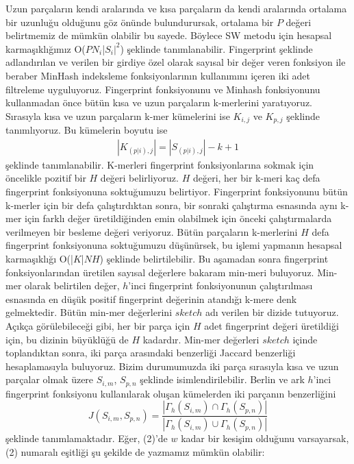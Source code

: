Uzun parçaların kendi aralarında ve kısa parçaların da kendi aralarında ortalama bir uzunluğu olduğunu göz önünde bulundurursak, ortalama bir $P$ değeri belirtmemiz de mümkün olabilir bu sayede. Böylece SW metodu için hesapsal karmaşıklığımız O($P$$N_i$|$S_i|^2$) şeklinde tanımlanabilir. Fingerprint şeklinde adlandırılan ve verilen bir girdiye özel olarak sayısal bir değer veren fonksiyon ile beraber MinHash indeksleme fonksiyonlarının kullanımını içeren iki adet filtreleme uyguluyoruz. Fingerprint fonksiyonunu ve Minhash fonksiyonunu kullanmadan önce bütün kısa ve uzun parçaların k-merlerini yaratıyoruz. Sırasıyla kısa ve uzun parçaların k-mer kümelerini ise $K_{i,j}$ ve $K_{p,j}$ şeklinde tanımlıyoruz. Bu kümelerin boyutu ise
\begin{gather*}
| K_{(p | i), j} | = |S_{(p | i),j}| - k + 1
\end{gather*}
şeklinde tanımlanabilir. K-merleri fingerprint fonksiyonlarına sokmak için öncelikle pozitif bir $H$ değeri belirliyoruz. $H$ değeri, her bir k-meri kaç defa fingerprint fonksiyonuna soktuğumuzu belirtiyor. Fingerprint fonksiyonunu bütün k-merler için bir defa çalıştırdıktan sonra, bir sonraki çalıştırma esnasında aynı k-mer için farklı değer üretildiğinden emin olabilmek için önceki çalıştırmalarda verilmeyen bir besleme değeri veriyoruz. Bütün parçaların k-merlerini $H$ defa fingerprint fonksiyonuna soktuğumuzu düşünürsek, bu işlemi yapmanın hesapsal karmaşıklığı O(|$K$|$NH$) şeklinde belirtilebilir. Bu aşamadan sonra fingerprint fonksiyonlarından üretilen sayısal değerlere bakaram min-meri buluyoruz. Min-mer olarak belirtilen değer, $h$'inci fingerprint fonksiyonunun çalıştırılması esnasında en düşük positif fingerprint değerinin atandığı k-mere denk gelmektedir. Bütün min-mer değerlerini $sketch$ adı verilen bir dizide tutuyoruz. Açıkça görülebileceği gibi, her bir parça için $H$ adet fingerprint değeri üretildiği için, bu dizinin büyüklüğü de $H$ kadardır. Min-mer değerleri $sketch$ içinde toplandıktan sonra, iki parça arasındaki benzerliği Jaccard benzerliği \cite{Jaccard1901} hesaplamasıyla buluyoruz. Bizim durumumuzda iki parça sırasıyla kısa ve uzun parçalar olmak üzere $S_{i,m}$, $S_{p,n}$ şeklinde isimlendirilebilir. Berlin ve ark $h$'inci fingerprint fonksiyonu kullanılarak oluşan kümelerden iki parçanın benzerliğini
\begin{equation}
J(S_{i,m}, S_{p,n}) = \dfrac{|\Gamma_{h}(S_{i,m}) \cap \Gamma_{h}(S_{p,n})|}{|\Gamma_{h}(S_{i,m}) \cup \Gamma_{h}(S_{p,n})|}
\end{equation}
şeklinde tanımlamaktadır. Eğer, (2)'de $w$ kadar bir kesişim olduğunu varsayarsak, (2) numaralı eşitliği şu şekilde de yazmamız mümkün olabilir:
$$
